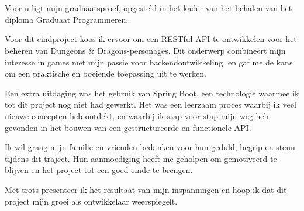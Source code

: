 
\chapter*{}%
\label{ch:voorwoord}


Voor u ligt mijn graduaatsproef, opgesteld in het kader van het behalen van het diploma Graduaat Programmeren.

Voor dit eindproject koos ik ervoor om een RESTful API te ontwikkelen voor het beheren van Dungeons & Dragons-personages. Dit onderwerp combineert mijn interesse in games met mijn passie voor backendontwikkeling, en gaf me de kans om een praktische en boeiende toepassing uit te werken.

Een extra uitdaging was het gebruik van Spring Boot, een technologie waarmee ik tot dit project nog niet had gewerkt. Het was een leerzaam proces waarbij ik veel nieuwe concepten heb ontdekt, en waarbij ik stap voor stap mijn weg heb gevonden in het bouwen van een gestructureerde en functionele API.

Ik wil graag mijn familie en vrienden bedanken voor hun geduld, begrip en steun tijdens dit traject. Hun aanmoediging heeft me geholpen om gemotiveerd te blijven en het project tot een goed einde te brengen.

Met trots presenteer ik het resultaat van mijn inspanningen en hoop ik dat dit project mijn groei als ontwikkelaar weerspiegelt.